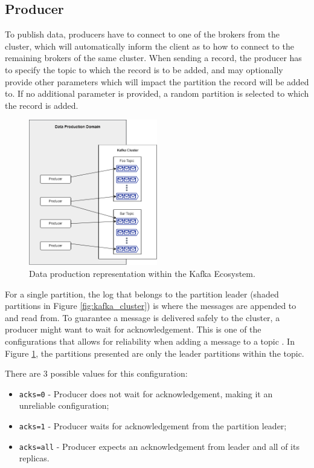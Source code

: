 \subsection{Producer}

To publish data, producers have to connect to one of the brokers from the
cluster, which will automatically inform the client as to how to connect to the
remaining brokers of the same cluster. When sending a record, the producer
has to specify the topic to which the record is to be added, and may optionally
provide other parameters which will impact the partition the record will be
added to. If no additional parameter is provided, a random partition is selected
to which the record is added.

\begin{figure}[hbt!] 
    \centering
    \includegraphics[width=0.5\textwidth]{images/infrastructure/Production Domain.png}
    \caption{
        Data production representation within the Kafka Ecosystem.
    } 
    \label{fig:data_production_domain} 
\end{figure}

For a single partition, the log that belongs to the partition leader (shaded
partitions in Figure \ref{fig:kafka_cluster}) is where the messages are appended
to and read from. To guarantee a message is delivered safely to the cluster, a
producer might want to wait for acknowledgement. This is one of the
configurations that allows for reliability when adding a message to a topic
\cite{KafkaProducer}. In Figure \ref{fig:data_production_domain}, the partitions
presented are only the leader partitions within the topic.

There are 3 possible values for this configuration:
\begin{itemize}
    \item \lstinline{acks=0} - Producer does not wait for acknowledgement, making it an
        unreliable configuration;
    \item \lstinline{acks=1} - Producer waits for acknowledgement from the partition
        leader;
    \item \lstinline{acks=all} - Producer expects an acknowledgement from leader and all
        of its replicas.
\end{itemize}

